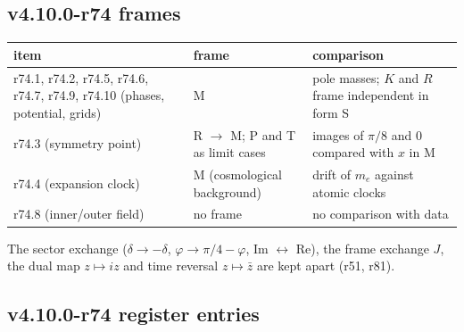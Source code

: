 \subsection*{v4.10.0-r74 frames}
\label{subsec:v4100-r74-frames}

\begin{center}
\small
\begin{tabular}{@{}>{\raggedright\arraybackslash}p{}>{\raggedright\arraybackslash}p{}>{\raggedright\arraybackslash}p{}@{}}
\toprule
item & frame & comparison\\
\midrule
r74.1, r74.2, r74.5, r74.6, r74.7, r74.9, r74.10 (phases, potential, grids) & M & pole masses; \(K\) and \(R\) frame independent in form S\\
r74.3 (symmetry point) & R \(\to\) M; P and T as limit cases & images of \(\pi/8\) and \(0\) compared with \(x\) in M\\
r74.4 (expansion clock) & M (cosmological background) & drift of \(m_e\) against atomic clocks\\
r74.8 (inner/outer field) & no frame & no comparison with data\\
\bottomrule
\end{tabular}
\end{center}
The sector exchange (\(\delta\to-\delta\), \(\varphi\to\pi/4-\varphi\), Im \(\leftrightarrow\) Re), the frame exchange \(J\), the dual map
\(z\mapsto iz\) and time reversal \(z\mapsto\bar z\) are kept apart (r51, r81).

\subsection*{v4.10.0-r74 register entries}
\label{subsec:v4100-r74-register}

